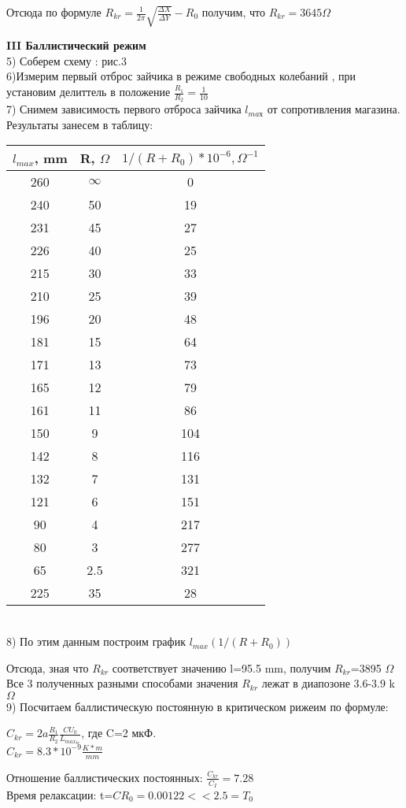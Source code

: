 \documentclass[a4paper,12pt]{article} %
\begin{document}
Отсюда по формуле $R_{kr}=\frac{1}{2\pi}\sqrt{{\frac{\Delta X }{\Delta Y}}}-R_0$ получим, что $R_{kr}=3645 \Omega$


\textbf{III Баллистический режим}\\
5) Соберем схему : рис.3\\
6)Измерим первый отброс зайчика в режиме свободных колебаний , при установим делиттель в положение $\frac{R_1}{R_2}=\frac{1}{10}$\\
7) Снимем зависимость первого отброса зайчика $l_{maх}$ от сопротивления магазина. Результаты занесем в таблицу:\\
\begin{tabular}{|c|c|c|}
\hline 
$l_{max}$, mm & R, $\Omega$ & $ 1/(R+R_0) *10^{-6}, \Omega^{-1}$ \\ 
\hline 
260 & $\infty$ & 0 \\ 
\hline 
240 & 50 & 19 \\ 
\hline 
231 & 45 & 27 \\ 
\hline 
226 & 40 & 25 \\ 
\hline 
215 & 30 & 33 \\ 
\hline 
210 & 25 & 39 \\ 
\hline 
196 & 20 & 48 \\ 
\hline 
181 & 15 & 64 \\ 
\hline 
171 & 13 & 73 \\ 
\hline 
165 & 12 & 79 \\ 
\hline 
161 & 11 & 86 \\ 
\hline 
150 & 9 & 104 \\ 
\hline 
142 & 8 & 116 \\ 
\hline 
132 & 7 & 131 \\ 
\hline 
121 & 6 & 151 \\ 
\hline 
90 & 4 & 217 \\ 
\hline 
80 & 3 & 277 \\ 
\hline 
65 & 2.5 & 321 \\ 
\hline 
225 & 35 & 28 \\ 
\hline 
\end{tabular} 
\\
8) По этим данным построим график $l_{max}(1/(R+R_0))$\\
\begin{flushleft}

\end{flushleft}


Отсюда, зная что $R_{kr}$ соответствует значению l=95.5 mm, получим $R_{kr}$=3895 $\Omega$
\\
Все 3 полученных разными способами значения $R_{kr}$ лежат в диапозоне 3.6-3.9 k$\Omega$\\
9) Посчитаем баллистическую постоянную в критическом рижеим по формуле: \\
\begin{center}

$C_{kr}=2a\frac{R_1}{R_2}\frac{CU_0}{L_{max_{kr}}}$, где C=2 мкФ. \\
 $C_{kr}=8.3*10^{-9} \frac{K*m}{mm}$


Отношение баллистических постоянных: $\frac{C_{kr}}{C_I}=7.28$\\
Время релаксации: t=$CR_0=0.00122<<2.5=T_0$
\end{center}
\end{document}
